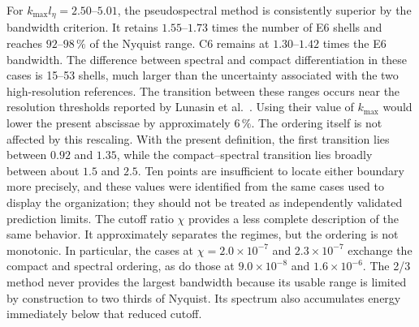 \documentclass[11pt,a4paper]{article}
\begin{document}
For $k_{\max}l_\eta=2.50$--$5.01$, the pseudospectral method is consistently superior by the bandwidth criterion. It retains $1.55$--$1.73$ times the number of E6 shells and reaches $92$--$98\,\%$ of the Nyquist range. C6 remains at $1.30$--$1.42$ times the E6 bandwidth. The difference between spectral and compact differentiation in these cases is 15--53 shells, much larger than the uncertainty associated with the two high-resolution references.
The transition between these ranges occurs near the resolution thresholds reported by Lunasin et al.~\cite{lunasin2007}. Using their value of $k_{\max}$ would lower the present abscissae by approximately $6\,\%$. The ordering itself is not affected by this rescaling. With the present definition, the first transition lies between $0.92$ and $1.35$, while the compact--spectral transition lies broadly between about $1.5$ and $2.5$. Ten points are insufficient to locate either boundary more precisely, and these values were identified from the same cases used to display the organization; they should not be treated as independently validated prediction limits.
The cutoff ratio $\chi$ provides a less complete description of the same behavior. It approximately separates the regimes, but the ordering is not monotonic. In particular, the cases at $\chi=2.0\times10^{-7}$ and $2.3\times10^{-7}$ exchange the compact and spectral ordering, as do those at $9.0\times10^{-8}$ and $1.6\times10^{-6}$. The 2/3 method never provides the largest bandwidth because its usable range is limited by construction to two thirds of Nyquist. Its spectrum also accumulates energy immediately below that reduced cutoff.
\end{document}
